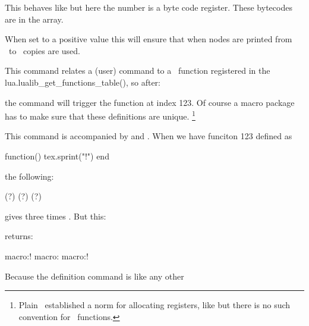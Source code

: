 \stopnewprimitive

\startnewprimitive[title={\prm {luabytecodecall}}]

This behaves like  but here the number is a byte code
register. These bytecodes are in the  array.

\stopnewprimitive

\startnewprimitive[title={\prm {luacopyinputnodes}}]

When set to a positive value this will ensure that when nodes are printed from
\LUA\ to \TEX\ copies are used.

\stopnewprimitive

\startnewprimitive[title={\prm {luadef}}]


This command relates a (user) command to a \LUA\ function registered in the \typ
{lua.lualib_get_functions_table()}, so after:

\starttyping
\luadef{}
\stoptyping

the \type {\foo} command will trigger the function at index 123. Of course a
macro package has to make sure that these definitions are unique. \footnote
{Plain \TEX\ established a norm for allocating registers, like \typ {\newdimen}
but there is no such convention for \LUA\ functions.}

This command is accompanied by  and
. When we have funciton 123 defined as

\starttyping
function() tex.sprint("!") end
\stoptyping

the following:

\starttyping
(\luafunctioncall  \foocode ?)
(\normalluafunction\foocode ?)
(\foo                       ?)
\stoptyping

gives three times . But this:

\starttyping
\edef\oof{\foo                      } \meaning\oof  %
\edef\oof{\luafunctioncall  \foocode} \meaning\oof  %
\edef\oof{\normalluafunction\foocode} \meaning\oof  %
\stoptyping

returns:

\starttyping
macro:!
macro:
macro:!
\stoptyping

Because the definition command is like any other

\starttyping
\permanent\protected\luadef{}
\stoptyping

